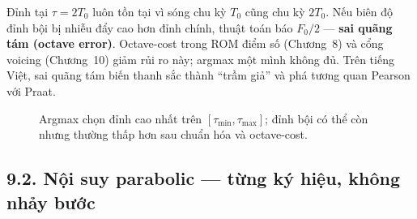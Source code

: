 \begin{physicalinsight}
Đỉnh tại $\tau = 2T_0$ luôn tồn tại vì sóng chu kỳ $T_0$ cũng chu kỳ $2T_0$. Nếu biên độ đỉnh bội bị nhiễu đẩy cao hơn đỉnh chính, thuật toán báo $F_0/2$ --- \textbf{sai quãng tám (octave error)}. Octave-cost trong ROM điểm số (Chương~8) và cổng voicing (Chương~10) giảm rủi ro này; argmax một mình không đủ. Trên tiếng Việt, sai quãng tám biến thanh sắc thành ``trầm giả'' và phá tương quan Pearson với Praat.
\end{physicalinsight}

\begin{figure}[H]
\centering
{}
\caption{Argmax chọn đỉnh cao nhất trên $[\tau_{\min},\tau_{\max}]$; đỉnh bội có thể còn nhưng thường thấp hơn sau chuẩn hóa và octave-cost.}
\label{fig:ch09_argmax}
\end{figure}

\subsection*{9.2. Nội suy parabolic --- từng ký hiệu, không nhảy bước}


